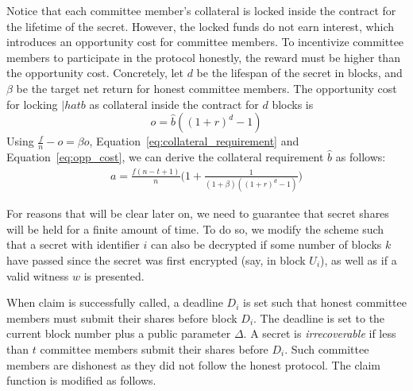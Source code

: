 Notice that each committee member's collateral is locked inside the contract for the lifetime of the secret.
However, the locked funds do not earn interest, which introduces an opportunity cost for committee members.
To incentivize committee members to participate in the protocol honestly, the reward must be higher than the opportunity cost.
Concretely, let $d$ be the lifespan of the secret in blocks, and $\beta$ be the target net return for honest committee members.
The opportunity cost for locking $|hat{b}$ as collateral inside the contract for $d$ blocks is
\begin{equation}\label{eq:opp_cost}
    o = \hat{b}((1 + r)^d - 1)
\end{equation}
Using $\frac{f}{n} - o = \beta o$, Equation~\ref{eq:collateral_requirement} and Equation~\ref{eq:opp_cost}, we can derive the collateral requirement $\hat{b}$ as follows:
\begin{gather}\label{eq:collateral_from_holding_fee}
    a = \frac{f(n - t + 1)}{n}\biggl(1 + \frac{1}{(1 + \beta)((1 + r)^d - 1)}\biggr)
\end{gather}



For reasons that will be clear later on, we need to guarantee that secret shares will be held for a finite amount of time.
To do so, we modify the scheme such that a secret with identifier $i$ can also be decrypted if some number of blocks $k$ have passed since the secret was first encrypted (say, in block $U_i$), as well as if a valid witness $w$ is presented.

When \textsf{claim} is successfully called, a deadline $D_i$ is set such that honest committee members must submit their shares before block $D_i$.
The deadline is set to the current block number plus a public parameter $\Delta$.
A secret is \emph{irrecoverable} if less than $t$ committee members submit their shares before $D_i$.
Such committee members are dishonest as they did not follow the honest protocol.
The \textsf{claim} function is modified as follows.

